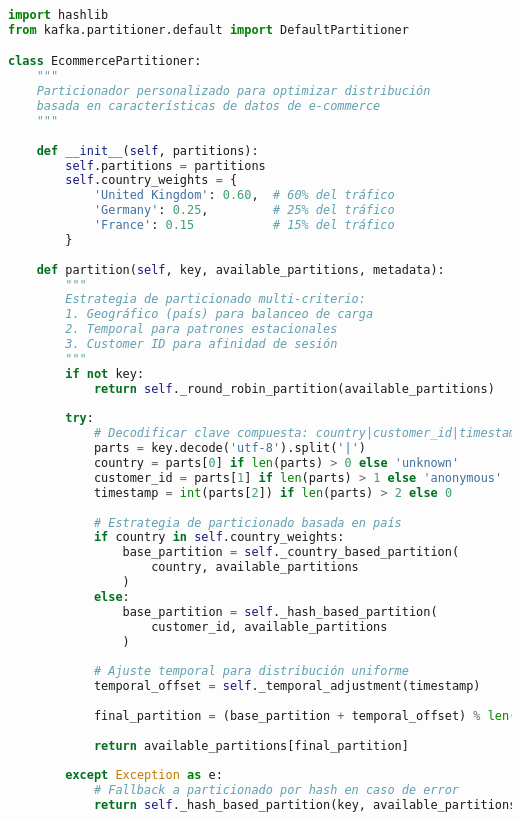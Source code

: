 \begin{lstlisting}[language=python, caption=Implementación de Particionador Personalizado, label=lst:custom_partitioner]
import hashlib
from kafka.partitioner.default import DefaultPartitioner

class EcommercePartitioner:
    """
    Particionador personalizado para optimizar distribución
    basada en características de datos de e-commerce
    """
    
    def __init__(self, partitions):
        self.partitions = partitions
        self.country_weights = {
            'United Kingdom': 0.60,  # 60% del tráfico
            'Germany': 0.25,         # 25% del tráfico  
            'France': 0.15           # 15% del tráfico
        }
    
    def partition(self, key, available_partitions, metadata):
        """
        Estrategia de particionado multi-criterio:
        1. Geográfico (país) para balanceo de carga
        2. Temporal para patrones estacionales
        3. Customer ID para afinidad de sesión
        """
        if not key:
            return self._round_robin_partition(available_partitions)
            
        try:
            # Decodificar clave compuesta: country|customer_id|timestamp
            parts = key.decode('utf-8').split('|')
            country = parts[0] if len(parts) > 0 else 'unknown'
            customer_id = parts[1] if len(parts) > 1 else 'anonymous'
            timestamp = int(parts[2]) if len(parts) > 2 else 0
            
            # Estrategia de particionado basada en país
            if country in self.country_weights:
                base_partition = self._country_based_partition(
                    country, available_partitions
                )
            else:
                base_partition = self._hash_based_partition(
                    customer_id, available_partitions
                )
            
            # Ajuste temporal para distribución uniforme
            temporal_offset = self._temporal_adjustment(timestamp)
            
            final_partition = (base_partition + temporal_offset) % len(available_partitions)
            
            return available_partitions[final_partition]
            
        except Exception as e:
            # Fallback a particionado por hash en caso de error
            return self._hash_based_partition(key, available_partitions)
    

\end{lstlisting}
